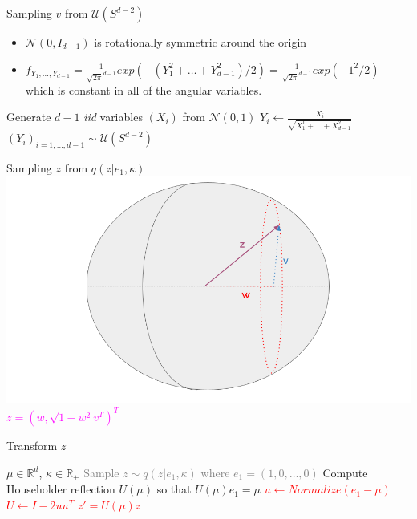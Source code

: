 \begin{frame}{Sampling $v$ from $\mathcal{U}(S^{d-2})$}
  \begin{itemize}
    \item $\mathcal{N}(0, I_{d-1})$ is rotationally symmetric around the origin
    \item $f_{Y_1, \dots, Y_{d-1}} = \frac{1}{\sqrt{2\pi}^{d-1}} exp(- (Y_1^2 + \dots + Y_{d-1}^2)/2) = \frac{1}{\sqrt{2\pi}^{d-1}}exp(-1^2/2) $ which is constant in all of the angular variables.
  \end{itemize}
  \vfill
  \begin{algorithm}[H]
    \caption{Sampling $v$ from $\mathcal{U}(S^{d-2})$}
  \begin{algorithmic}[1]
    \STATE Generate $d-1$ \textit{iid} variables $(X_i)$ from $\mathcal{N}(0, 1)$
    \STATE $Y_i \gets \frac{X_i}{\sqrt{X_1^1 + \dots + X_{d-1}^2}}$
    \RETURN $(Y_i)_{i=1, \dots, d-1} \sim \mathcal{U}(S^{d-2})$  
  \end{algorithmic}
  \end{algorithm}
\end{frame}

\begin{frame}{Sampling $z$ from $q(z|e_1, \kappa)$}
  \centering
  \includegraphics[width=\textwidth]{figures/illustration_sampling_4.png}
  \textcolor{magenta}{$z = (w, \sqrt{1 - w^2}v^T)^T$}
\end{frame}

\begin{frame}{Transform $z$}
  \begin{algorithm}[H]
    \caption{Overview of the sampling method from $vMF(\mu, \kappa)$}\label{alg:overviewsampling3}
    \begin{algorithmic}[1]
      \REQUIRE $\mu \in \mathbb{R}^d$, $\kappa \in \mathbb{R}_+$
      \textcolor{gray}{ \STATE Sample $z \sim q(z| e_1, \kappa)$ where $e_1 = (1, 0, \dots, 0)$ }
      \STATE Compute Householder reflection $U(\mu)$ so that $U(\mu) e_1 = \mu$
      \textcolor{red}{
      \STATE $u \gets Normalize(e_1 - \mu)$ 
      \STATE $U \gets I - 2uu^T$}
     \textcolor{red}{\RETURN $z' = U(\mu) z$}
    \end{algorithmic}
    \end{algorithm}
\end{frame}